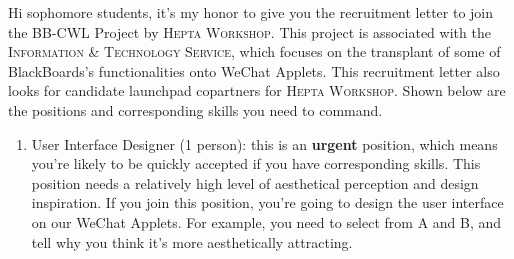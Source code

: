 \documentclass[a4paper,12pt]{texMemo}
\begin{document}
Hi sophomore students, it's my honor to give you the recruitment letter to join the BB-CWL Project by \textsc{Hepta Workshop}. This project is associated with the \textsc{Information \& Technology Service}, which focuses on the transplant of some of BlackBoards's functionalities onto WeChat Applets. This recruitment letter also looks for candidate launchpad copartners for \textsc{Hepta Workshop}. Shown below are the positions and corresponding skills you need to command.


\begin{enumerate}



\item User Interface Designer (1 person): this is an \textbf{urgent} position, which means you're likely to be quickly accepted if you have corresponding skills. This position needs a relatively high level of aesthetical perception and design inspiration. If you join this position, you're going to design the user interface on our WeChat Applets. For example, you need to select from A and B, and tell why you think it's more aesthetically attracting. \\



\end{enumerate}
\end{document}
